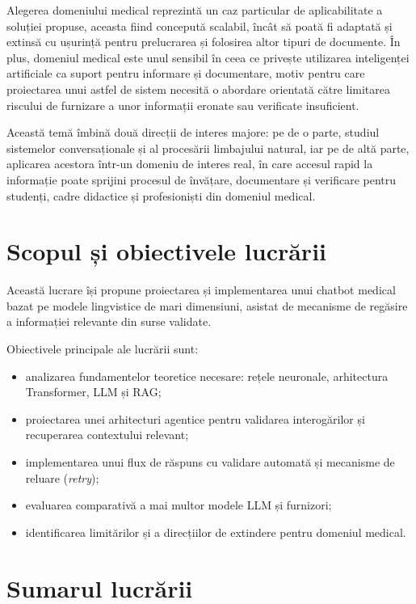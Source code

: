 \documentclass[12pt, a4paper, oneside, romanian]{teza-upb}
\begin{document}
Alegerea domeniului medical reprezintă un caz particular de aplicabilitate a soluției propuse, aceasta fiind concepută scalabil, încât să poată fi adaptată și extinsă cu ușurință pentru prelucrarea și folosirea altor tipuri de documente. În plus, domeniul medical este unul sensibil în ceea ce privește utilizarea inteligenței artificiale ca suport pentru informare și documentare, motiv pentru care proiectarea unui astfel de sistem necesită o abordare orientată către limitarea riscului de furnizare a unor informații eronate sau verificate insuficient.

Această temă îmbină două direcții de interes majore: pe de o parte, studiul sistemelor conversaționale și al procesării limbajului natural, iar pe de altă parte, aplicarea acestora într-un domeniu de interes real, în care accesul rapid la informație poate sprijini procesul de învățare, documentare și verificare pentru studenți, cadre didactice și profesioniști din domeniul medical.


\section{Scopul și obiectivele lucrării}

Această lucrare își propune proiectarea și implementarea unui chatbot medical bazat pe modele lingvistice de mari dimensiuni, asistat de mecanisme de regăsire a informației relevante din surse validate.

Obiectivele principale ale lucrării sunt:
\begin{itemize}
    \item analizarea fundamentelor teoretice necesare: rețele neuronale, arhitectura Transformer, LLM și RAG;
    \item proiectarea unei arhitecturi agentice pentru validarea interogărilor și recuperarea contextului relevant;
    \item implementarea unui flux de răspuns cu validare automată și mecanisme de reluare (\textit{retry});
    \item evaluarea comparativă a mai multor modele LLM și furnizori;
    \item identificarea limitărilor și a direcțiilor de extindere pentru domeniul medical.
\end{itemize}

\section{Sumarul lucrării}
\end{document}
